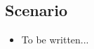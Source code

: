 \documentclass{article}
\begin{document}
		\subsection{Scenario}
			\begin{itemize}
				\item To be written... %
			\end{itemize}
\end{document}
